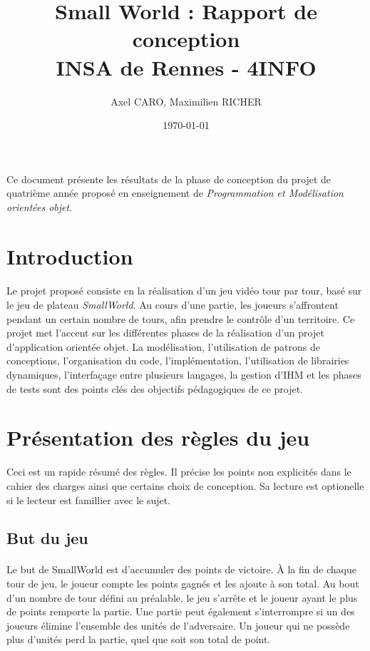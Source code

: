 \documentclass[a4paper]{article}
\title{Small World : Rapport de conception \\ INSA de Rennes - 4INFO}
\author{Axel CARO, Maximilien RICHER}
\date{\today}
\begin{document}
\maketitle

\paragraph{}
Ce document présente les résultats de la phase de conception du projet de quatrième année proposé en enseignement de \textit{Programmation et Modélisation orientées objet}.
\\
\tableofcontents

\newpage

\section*{Introduction}
\paragraph{}
Le projet proposé consiste en la réalisation d'un jeu vidéo tour par tour, basé sur le jeu de plateau \textit{SmallWorld}. Au cours d'une partie, les joueurs s'affrontent pendant un certain nombre de tours, afin prendre le contrôle d'un territoire. Ce projet met l'accent sur les différentes phases de la réalisation d'un projet d'application orientée objet. La modélisation, l'utilisation de patrons de conceptions, l'organisation du code, l'implémentation, l'utilisation de librairies dynamiques, l'interfaçage entre plusieurs langages, la gestion d'IHM et les phases de tests sont des points clés des objectifs pédagogiques de ce projet.

\section{Présentation des règles du jeu}
Ceci est un rapide résumé des règles. Il précise les points non explicités dans le cahier des charges ainsi que certains choix de conception. Sa lecture est optionelle si le lecteur est famillier avec le sujet.

\subsection{But du jeu}
\paragraph{}
Le but de SmallWorld est d'accumuler des points de victoire.
À la fin de chaque tour de jeu, le joueur compte les points gagnés et les ajoute à son total. Au bout d'un nombre de tour défini au préalable, le jeu s'arrête et le joueur ayant le plus de points remporte la partie. Une partie peut également s'interrompre si un des joueurs élimine l'ensemble des unités de l'adversaire. Un joueur qui ne possède plus d'unités perd la partie, quel que soit son total de point.
\end{document}

